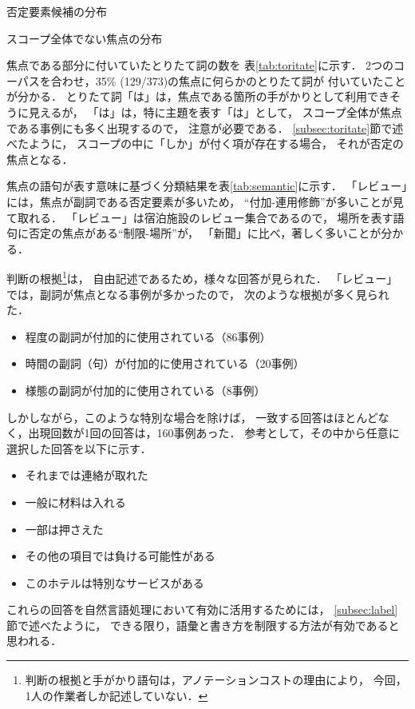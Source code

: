 \documentclass[japanese]{jnlp_1.4}
\begin{document}
\begin{table}[b]
\begin{minipage}[t]{0.48\hsize}
\caption{否定要素候補の分布}
\label{tab:neg}

\end{minipage}
\hfill
\begin{minipage}[t]{0.48\hsize}
\caption{スコープ全体でない焦点の分布}
\label{tab:foc}

\end{minipage}
\end{table}

焦点である部分に付いていたとりたて詞の数を
表\ref{tab:toritate}に示す．
2つのコーパスを合わせ，35\% (129/373)の焦点に何らかのとりたて詞が
付いていたことが分かる．
とりたて詞「は」は，焦点である箇所の手がかりとして利用できそうに見えるが，
「は」は，特に主題を表す「は」として，
スコープ全体が焦点である事例にも多く出現するので，
注意が必要である．
\ref{subsec:toritate}節で述べたように，
スコープの中に「しか」が付く項が存在する場合，
それが否定の焦点となる．

焦点の語句が表す意味に基づく分類結果を表\ref{tab:semantic}に示す．
「レビュー」には，焦点が副詞である否定要素が多いため，
``付加-連用修飾''が多いことが見て取れる．
「レビュー」は宿泊施設のレビュー集合であるので，
場所を表す語句に否定の焦点がある``制限-場所''が，
「新聞」に比べ，著しく多いことが分かる．

判断の根拠\footnote{
判断の根拠と手がかり語句は，アノテーションコストの理由により，
今回，1人の作業者しか記述していない．}は，
自由記述であるため，様々な回答が見られた．
「レビュー」では，副詞が焦点となる事例が多かったので，
次のような根拠が多く見られた．
\begin{itemize}
\item 程度の副詞が付加的に使用されている（86事例）
\item 時間の副詞（句）が付加的に使用されている（20事例）
\item 様態の副詞が付加的に使用されている（8事例）
\end{itemize}
しかしながら，このような特別な場合を除けば，
一致する回答はほとんどなく，出現回数が1回の回答は，160事例あった．
参考として，その中から任意に選択した回答を以下に示す．
\begin{itemize}
\item それまでは連絡が取れた
\item 一般に材料は入れる
\item 一部は押さえた
\item その他の項目では負ける可能性がある
\item このホテルは特別なサービスがある
\end{itemize}
これらの回答を自然言語処理において有効に活用するためには，
\ref{subsec:label}節で述べたように，
できる限り，語彙と書き方を制限する方法が有効であると思われる．
\end{document}
